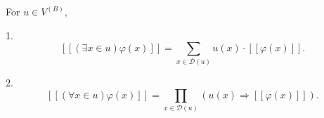 For $u \in V^{(B)}$,

1. $$[\![(\exists x \in u) \varphi(x)]\!] = \sum_{x \in \mathcal{D}(u)} u(x) \cdot [\![\varphi(x)]\!].$$

2. $$[\![(\forall x \in u) \varphi(x)]\!] = \prod_{x \in \mathcal{D}(u)} (u(x) \Rightarrow [\![\varphi(x)]\!]).$$
